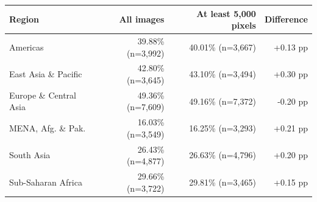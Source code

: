 \begin{tabular}{@{}lrrr@{}}
\toprule
Region & All images & At least 5,000 pixels & Difference \\
\midrule
Americas & 39.88\% (n=3,992) & 40.01\% (n=3,667) & +0.13 pp \\
East Asia \& Pacific & 42.80\% (n=3,645) & 43.10\% (n=3,494) & +0.30 pp \\
Europe \& Central Asia & 49.36\% (n=7,609) & 49.16\% (n=7,372) & -0.20 pp \\
MENA, Afg. \& Pak. & 16.03\% (n=3,549) & 16.25\% (n=3,293) & +0.21 pp \\
South Asia & 26.43\% (n=4,877) & 26.63\% (n=4,796) & +0.20 pp \\
Sub-Saharan Africa & 29.66\% (n=3,722) & 29.81\% (n=3,465) & +0.15 pp \\
\bottomrule
\end{tabular}
